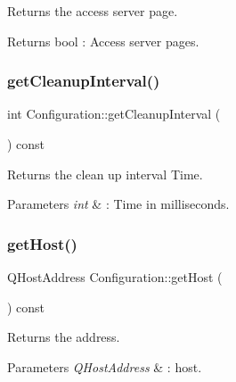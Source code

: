Returns the access server page. 

\begin{DoxyReturn}{Returns}
bool \+: Access server pages. 
\end{DoxyReturn}
\mbox{\label{class_configuration_a6a592b2194d4059f31aaf4223ee2e70e}} 
\subsubsection{\texorpdfstring{get\+Cleanup\+Interval()}{getCleanupInterval()}}
{\footnotesize\ttfamily int Configuration\+::get\+Cleanup\+Interval (\begin{DoxyParamCaption}{ }\end{DoxyParamCaption}) const\hspace{0.3cm}{\ttfamily [inline]}}



Returns the clean up interval Time. 


\begin{DoxyParams}{Parameters}
{\em int} & \+: Time in milliseconds. \\
\hline
\end{DoxyParams}
\mbox{\label{class_configuration_a37ca7476a8ab5a1e6c4b5a3e07670d9f}} 
\subsubsection{\texorpdfstring{get\+Host()}{getHost()}}
{\footnotesize\ttfamily Q\+Host\+Address Configuration\+::get\+Host (\begin{DoxyParamCaption}{ }\end{DoxyParamCaption}) const\hspace{0.3cm}{\ttfamily [inline]}}



Returns the address. 


\begin{DoxyParams}{Parameters}
{\em Q\+Host\+Address} & \+: host. \\
\hline
\end{DoxyParams}
\mbox{\label{class_configuration_a2d039a90ec3caaace268f9f101bb1d87}} 

